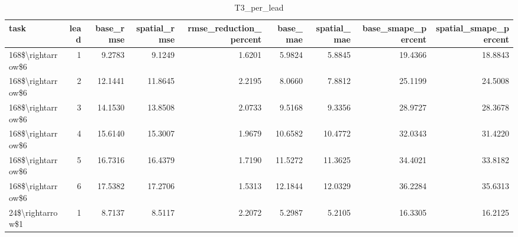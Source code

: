 \begin{table}
\caption{T3_per_lead}
\label{tab:T3_per_lead}
\begin{tabular}{lrrrrrrrr}
\toprule
task & lead & base\_rmse & spatial\_rmse & rmse\_reduction\_percent & base\_mae & spatial\_mae & base\_smape\_percent & spatial\_smape\_percent \\
\midrule
168\$\textbackslash rightarrow\$6 & 1 & 9.2783 & 9.1249 & 1.6201 & 5.9824 & 5.8845 & 19.4366 & 18.8843 \\
168\$\textbackslash rightarrow\$6 & 2 & 12.1441 & 11.8645 & 2.2195 & 8.0660 & 7.8812 & 25.1199 & 24.5008 \\
168\$\textbackslash rightarrow\$6 & 3 & 14.1530 & 13.8508 & 2.0733 & 9.5168 & 9.3356 & 28.9727 & 28.3678 \\
168\$\textbackslash rightarrow\$6 & 4 & 15.6140 & 15.3007 & 1.9679 & 10.6582 & 10.4772 & 32.0343 & 31.4220 \\
168\$\textbackslash rightarrow\$6 & 5 & 16.7316 & 16.4379 & 1.7190 & 11.5272 & 11.3625 & 34.4021 & 33.8182 \\
168\$\textbackslash rightarrow\$6 & 6 & 17.5382 & 17.2706 & 1.5313 & 12.1844 & 12.0329 & 36.2284 & 35.6313 \\
24\$\textbackslash rightarrow\$1 & 1 & 8.7137 & 8.5117 & 2.2072 & 5.2987 & 5.2105 & 16.3305 & 16.2125 \\
\bottomrule
\end{tabular}
\end{table}
